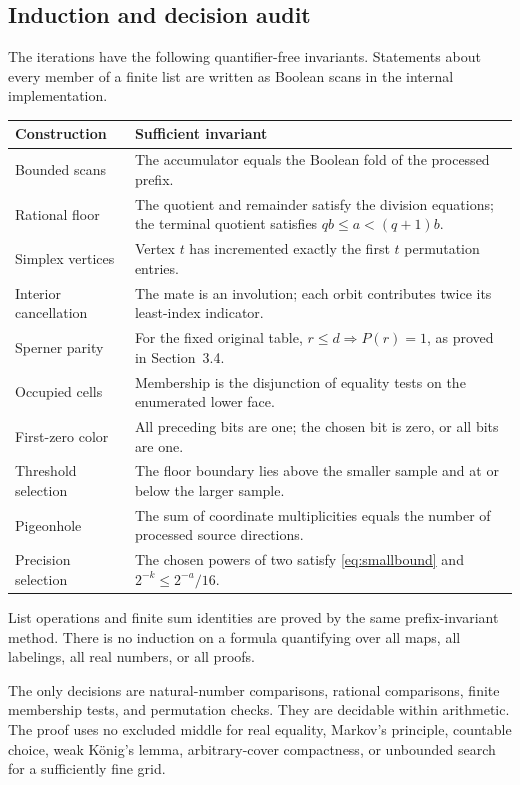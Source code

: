 \documentclass[11pt,a4paper]{article}
\theoremstyle{definition}
\begin{document}
\subsection{Induction and decision audit}
The iterations have the following quantifier-free invariants.
Statements about every member of a finite list are written
as Boolean scans in the internal implementation.

\begin{longtable}{p{}p{}}
\toprule
Construction & Sufficient invariant\\
\midrule
\endhead
Bounded scans &
The accumulator equals the Boolean fold of the processed prefix.\\
Rational floor &
The quotient and remainder satisfy the division equations;
the terminal quotient satisfies $qb\leq a<(q+1)b$.\\
Simplex vertices &
Vertex $t$ has incremented exactly the first $t$ permutation entries.\\
Interior cancellation &
The mate is an involution; each orbit contributes twice its
least-index indicator.\\
Sperner parity &
For the fixed original table, $r\leq d\Rightarrow P(r)=1$,
as proved in Section~3.4.\\
Occupied cells &
Membership is the disjunction of equality tests on the
enumerated lower face.\\
First-zero color &
All preceding bits are one; the chosen bit is zero,
or all bits are one.\\
Threshold selection &
The floor boundary lies above the smaller sample and
at or below the larger sample.\\
Pigeonhole &
The sum of coordinate multiplicities equals the
number of processed source directions.\\
Precision selection &
The chosen powers of two satisfy \eqref{eq:smallbound}
and $2^{-k}\leq2^{-a}/16$.\\
\bottomrule
\end{longtable}

List operations and finite sum identities are proved by the
same prefix-invariant method. There is no induction on a
formula quantifying over all maps, all labelings, all real
numbers, or all proofs.

The only decisions are natural-number comparisons, rational
comparisons, finite membership tests, and permutation checks.
They are decidable within arithmetic. The proof uses no
excluded middle for real equality, Markov's principle,
countable choice, weak K\"onig's lemma, arbitrary-cover
compactness, or unbounded search for a sufficiently fine
grid.
\end{document}
